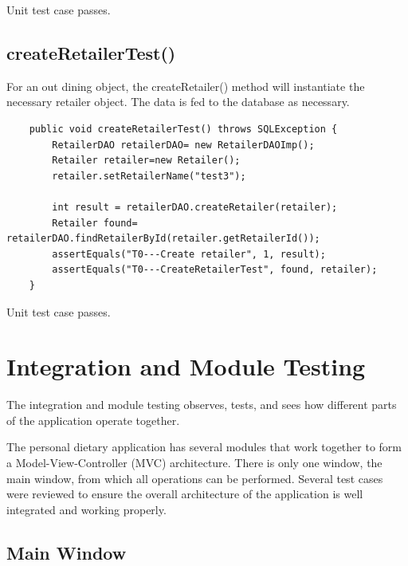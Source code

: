 \documentclass[table]{scrreprt}
\begin{document}
Unit test case passes.

\subsection{createRetailerTest()}

For an out dining object, the createRetailer() method will instantiate the necessary retailer object. The data is fed to the database as necessary.

\begin{verbatim}
    public void createRetailerTest() throws SQLException {
        RetailerDAO retailerDAO= new RetailerDAOImp();
        Retailer retailer=new Retailer();
        retailer.setRetailerName("test3");

        int result = retailerDAO.createRetailer(retailer);
        Retailer found= retailerDAO.findRetailerById(retailer.getRetailerId());
        assertEquals("T0---Create retailer", 1, result);
        assertEquals("T0---CreateRetailerTest", found, retailer);
    }
\end{verbatim}

Unit test case passes.

\newpage

    \section{Integration and Module Testing}
    The integration and module testing observes, tests, and sees how different parts of the application operate together. \par
    The personal dietary application has several modules that work together to form a Model-View-Controller (MVC) architecture. There is only one window, the main window, from which all operations can be performed. Several test cases were reviewed to ensure the overall architecture of the application is well integrated and working properly.

    \subsection{Main Window}
    
\end{document}

